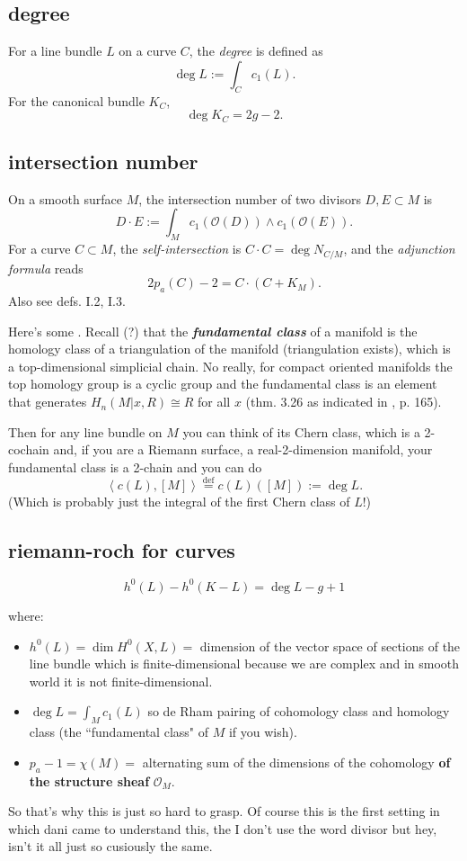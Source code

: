 \subsection{degree}
For a line bundle \( L \) on a curve \( C \), the \emph{degree} is defined as
\[
\deg L := \int_C c_1(L).
\]
For the canonical bundle \( K_C \),
\[
\deg K_C = 2g - 2.
\]

\subsection{intersection number}
On a smooth surface \( M \), the intersection number of two divisors \( D, E \subset M \) is
\[
D \cdot E := \int_M c_1(\mathcal{O}(D)) \wedge c_1(\mathcal{O}(E)).
\]
For a curve \( C \subset M \), the \emph{self-intersection} is \( C \cdot C = \deg N_{C/M} \), and the \emph{adjunction formula} reads
\[
2p_a(C) - 2 = C \cdot (C + K_M).
\]
Also see \cite{beu} defs. I.2, I.3.

Here's some \cite{lec}. Recall (?) that the \textit{\textbf{fundamental class}} of a manifold is the homology class of a triangulation of the manifold (triangulation exists), which is a top-dimensional simplicial chain. No really, for compact oriented manifolds the top homology group is a cyclic group and the fundamental class is an element that generates \(H_n(M|x,R)\cong R\) for all \(x\) (thm. 3.26 \cite{hat} as indicated in \cite{lec}, p. 165).

Then for any line bundle on  \(M\) you can think of its Chern class, which is a 2-cochain and, if you are a Riemann surface, a real-2-dimension manifold, your fundamental class is a 2-chain and you can do
\[\left<c(L),[M]\right>\overset{\operatorname{def}}{=}c(L)([M]):=\operatorname{deg}L.\]
(Which is probably just the integral of the first Chern class of \(L\)!)


\subsection{riemann-roch for curves}
	\[\boxed{h^0(L)-h^0(K-L)=\operatorname{deg}L-g+1}\]

where:
\begin{itemize}
\item \(h^0(L)=\dim H^{0}(X,L)=\) dimension of the vector space of sections of the line bundle which is finite-dimensional because we are complex and in smooth world it is not finite-dimensional.
\item \(\operatorname{deg}L=\int_M c_1(L)\) so de Rham pairing of cohomology class and homology  class (the ``fundamental class" of \(M\) if you wish).
 \item \(p_a-1=\chi(M)=\) alternating sum of the dimensions of the cohomology \textbf{of the structure sheaf} \(\mathcal{O}_M\).
\end{itemize}
So that's why this is just so hard to grasp. Of course this is the first setting in which dani came to understand this, the I don't use the word divisor but hey, isn't it all just so cusiously the same.

